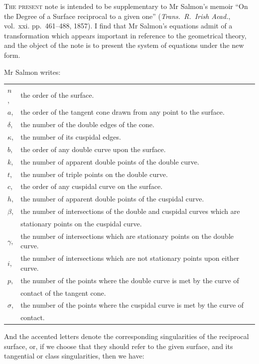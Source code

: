\documentclass[11pt,a4paper]{book}
\theoremstyle{plain}
\begin{document}
\bigskip

\textsc{The present} note is intended to be supplementary to Mr Salmon's memoir ``On the Degree of a Surface reciprocal to a given one'' (\textit{Trans.\ R.\ Irish Acad.}, vol.~xxi. pp.~461--488, 1857). I find that Mr Salmon's equations admit of a transformation which appears important in reference to the geometrical theory, and the object of the note is to present the system of equations under the new form.

Mr Salmon writes:

\begin{tabular}{@{}ll@{}}
$n$, & the order of the surface. \\
$a$, & the order of the tangent cone drawn from any point to the surface. \\
$\delta$, & the number of the double edges of the cone. \\
$\kappa$, & the number of its cuspidal edges. \\
$b$, & the order of any double curve upon the surface. \\
$k$, & the number of apparent double points of the double curve. \\
$t$, & the number of triple points on the double curve. \\
$c$, & the order of any cuspidal curve on the surface. \\
$h$, & the number of apparent double points of the cuspidal curve. \\
$\beta$, & the number of intersections of the double and cuspidal curves which are \\
 & \quad stationary points on the cuspidal curve. \\
$\gamma$, & the number of intersections which are stationary points on the double curve. \\
$i$, & the number of intersections which are not stationary points upon either curve. \\
$p$, & the number of the points where the double curve is met by the curve of \\
 & \quad contact of the tangent cone. \\
$\sigma$, & the number of the points where the cuspidal curve is met by the curve of \\
 & \quad contact. \\
\end{tabular}

And the accented letters denote the corresponding singularities of the reciprocal surface, or, if we choose that they should refer to the given surface, and its tangential or class singularities, then we have:
\end{document}
